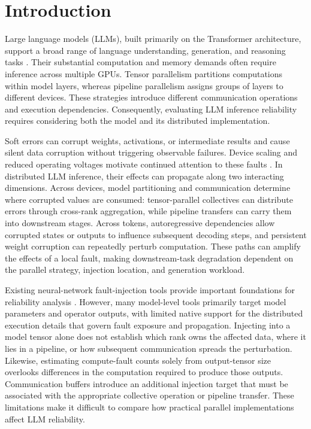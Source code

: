 \section{Introduction}

Large language models (LLMs), built primarily on the Transformer architecture, support a broad range of language understanding, generation, and reasoning tasks \cite{vaswani2017attention,brown2020language,zhao2023survey}. Their substantial computation and memory demands often require inference across multiple GPUs. Tensor parallelism partitions computations within model layers, whereas pipeline parallelism assigns groups of layers to different devices. These strategies introduce different communication operations and execution dependencies. Consequently, evaluating LLM inference reliability requires considering both the model and its distributed implementation.

Soft errors can corrupt weights, activations, or intermediate results and cause silent data corruption without triggering observable failures. Device scaling and reduced operating voltages motivate continued attention to these faults \cite{mukherjee2005soft,borkar2006designing,baumann2005radiation,frustaci2015sram}. In distributed LLM inference, their effects can propagate along two interacting dimensions. Across devices, model partitioning and communication determine where corrupted values are consumed: tensor-parallel collectives can distribute errors through cross-rank aggregation, while pipeline transfers can carry them into downstream stages. Across tokens, autoregressive dependencies allow corrupted states or outputs to influence subsequent decoding steps, and persistent weight corruption can repeatedly perturb computation. These paths can amplify the effects of a local fault, making downstream-task degradation dependent on the parallel strategy, injection location, and generation workload.

Existing neural-network fault-injection tools provide important foundations for reliability analysis \cite{reagen2018ares,mahmoud2020pytorchfi,huang2024mrfi,mahmoud2021optimizing,wan2024mulberry}. However, many model-level tools primarily target model parameters and operator outputs, with limited native support for the distributed execution details that govern fault exposure and propagation. Injecting into a model tensor alone does not establish which rank owns the affected data, where it lies in a pipeline, or how subsequent communication spreads the perturbation. Likewise, estimating compute-fault counts solely from output-tensor size overlooks differences in the computation required to produce those outputs. Communication buffers introduce an additional injection target that must be associated with the appropriate collective operation or pipeline transfer. These limitations make it difficult to compare how practical parallel implementations affect LLM reliability.

